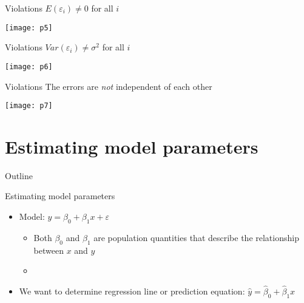 \documentclass[xcolor=dvipsnames]{beamer}
\begin{document}
\begin{frame}{Violations}
$E(\varepsilon_i) \neq 0$ for all $i$
\begin{center}
	\texttt{[image: p5]}
\end{center}
\end{frame}

\begin{frame}{Violations}
$Var(\varepsilon_i) \neq \sigma^2$ for all $i$
\begin{center}
	\texttt{[image: p6]}
\end{center}
\end{frame}

\begin{frame}{Violations}
The errors are \emph{not} independent of each other
\begin{center}
	\texttt{[image: p7]}
\end{center}
\end{frame}

\section{Estimating model parameters}
\begin{frame}{Outline}
\tableofcontents[currentsection,subsectionstyle=show/shaded/hide]
\end{frame}

\begin{frame}{Estimating model parameters}
	\begin{itemize}
		\item Model: $y = \beta_0 + \beta_1 x + \varepsilon$ \pause
		\begin{itemize}
			\item Both $\beta_0$ and $\beta_1$ are population quantities that describe the relationship between $x$ and $y$ \pause
			\item[]
		\end{itemize}
		\item We want to determine regression line or prediction equation: $\hat{y} = \hat{\beta}_0 + \hat{\beta}_1 x$
	\end{itemize}
\end{frame}
\end{document}
